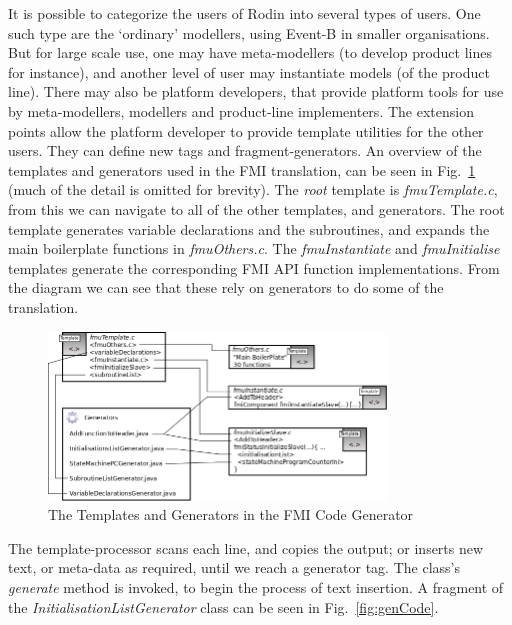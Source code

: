 \documentclass{llncs}%
\begin{document}
It is possible to categorize the users of Rodin into several types of users. One such type are the `ordinary' modellers, using Event-B in smaller organisations. But for large scale use, one may have meta-modellers (to develop product lines for instance), and another level of user may instantiate models (of the product line). There may also be platform developers, that provide platform tools for use by meta-modellers, modellers and product-line implementers. The extension points allow the platform developer to provide template utilities for the other users. They can define new tags and fragment-generators.
An overview of the  templates and generators used in the FMI translation, can be seen in Fig.~\ref{fig:templateStructure} (much of the detail is omitted for brevity). The \emph{root} template is \emph{fmuTemplate.c}, from this we can navigate to all of the other templates, and generators. The root template generates variable declarations and the subroutines, and expands the main boilerplate functions in \emph{fmuOthers.c}. The \emph{fmuInstantiate} and \emph{fmuInitialise} templates generate the corresponding FMI API function implementations. From the diagram we can see that these rely on generators to do some of the translation.
%
\begin{figure}[t]
\vspace*{-12pt}
\centering
\includegraphics[width=0.8\textwidth]{templateStructure.png}
\caption{The Templates and Generators in the FMI Code Generator}
\label{fig:templateStructure}
\vspace*{-12pt}
\end{figure}
%
The template-processor scans each line, and copies the output; or inserts new text, or meta-data as required, until we reach a generator tag. The class's \emph{generate} method is invoked, to begin the process of text insertion. A fragment of the \emph{InitialisationListGenerator} class can be seen in Fig.~\ref{fig:genCode}. 
%
%
\end{document}
